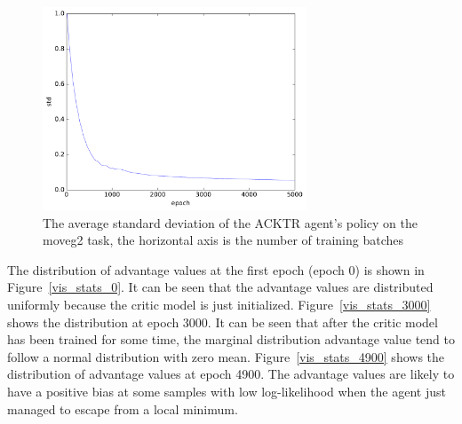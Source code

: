 \begin{figure}[!htbp]
\label{key}	\includegraphics[width=0.7\textwidth]{images/rec_180528_std_statlog.pdf}
	\centering
	\caption{The average standard deviation of the ACKTR agent's policy on the moveg2 task, the horizontal axis is the number of training batches}\label{rec_stat_moveg2_std}
\end{figure}
The distribution of advantage values at the first epoch (epoch 0) is shown in Figure~\ref{vis_stats_0}. It can be seen that the advantage values are distributed uniformly because the critic model is just initialized. Figure~\ref{vis_stats_3000} shows the distribution at epoch 3000. It can be seen that after the critic model has been trained for some time, the marginal distribution advantage value tend to follow a normal distribution with zero mean.  Figure~\ref{vis_stats_4900} shows the distribution of advantage values at epoch 4900. The advantage values are likely to have a positive bias at some samples with low log-likelihood  when the agent just managed to escape from a local minimum.  

